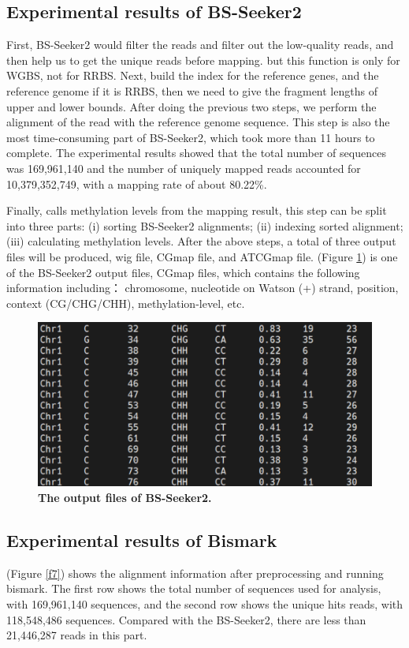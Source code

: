 \documentclass{PHlab-thesis}
\begin{document}
\subsection{Experimental results of BS-Seeker2}
First, BS-Seeker2 would filter the reads and filter out the low-quality reads, and then help us to get the unique reads before mapping. but this function is only for WGBS, not for RRBS. Next, build the index for the reference genes, and the reference genome if it is RRBS, then we need to give the fragment lengths of upper and lower bounds. After doing the previous two steps, we perform the alignment of the read with the reference genome sequence. This step is also the most time-consuming part of BS-Seeker2, which took more than 11 hours to complete. The experimental results showed that the total number of sequences was 169,961,140 and the number of uniquely mapped reads accounted for 10,379,352,749, with a mapping rate of about 80.22\%.

\par
Finally, calls methylation levels from the mapping result, this step can be split into three parts: (i) sorting BS-Seeker2 alignments; (ii) indexing sorted alignment; (iii) calculating methylation levels. After the above steps, a total of three output files will be produced, wig file, CGmap file, and ATCGmap file. (Figure \ref{f6}) is one of the BS-Seeker2 output files, CGmap files, which contains the following information including： chromosome, nucleotide on Watson (+) strand, position, context (CG/CHG/CHH), methylation-level, etc.

\begin{figure}[h]
  \centering
  \includegraphics[scale=0.8]{table/CGmap.png}
  \caption{\textbf{The output files of BS-Seeker2.}
  }
  \label{f6}
\end{figure}


\subsection{Experimental results of Bismark}
(Figure \ref{f7}) shows the alignment information after preprocessing and running bismark. The first row shows the total number of sequences used for analysis, with 169,961,140 sequences, and the second row shows the unique hits reads, with 118,548,486 sequences. Compared with the BS-Seeker2, there are less than 21,446,287 reads in this part.
\end{document}
